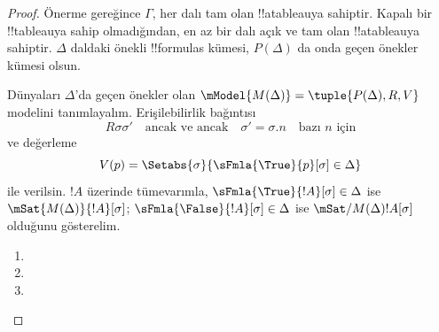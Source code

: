 \begin{proof}
Önerme gereğince $\Gamma$, her dalı tam olan !!a{tableau}{}ya sahiptir. Kapalı
bir !!{tableau}{}ya sahip olmadığından, en az bir dalı açık ve tam olan
!!a{tableau}{}ya sahiptir. $\Delta$ daldaki önekli !!{formula}s kümesi,
$P(\Delta)$ da onda geçen önekler kümesi olsun.

Dünyaları $\Delta$'da geçen önekler olan
$\mModel{M(\Delta)} = \tuple{P(\Delta), R, V}$ modelini tanımlayalım.
Erişilebilirlik bağıntısı
\[
R\sigma\sigma' \quad \text{ancak ve ancak} \quad
\sigma'=\sigma.n \quad \text{bazı $n$ için}
\]
ve değerleme
\[
V(p) = \Setabs{\sigma}{\sFmla{\True}{p}[\sigma] \in \Delta}
\]
ile verilsin. $!A$ üzerinde tümevarımla,
$\sFmla{\True}{!A}[\sigma] \in \Delta$ ise
$\mSat{M(\Delta)}{!A}[\sigma]$; $\sFmla{\False}{!A}[\sigma] \in \Delta$
ise $\mSat/{M(\Delta)}{!A}[\sigma]$ olduğunu gösterelim.

\begin{enumerate}
  \item {}
  \item {}
  \item {}
\end{enumerate}
\end{proof}
